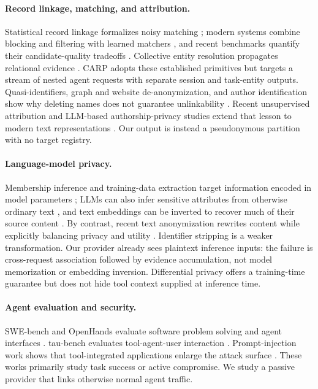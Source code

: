 \documentclass[letterpaper]{article}
\newcommand{\carp}{\textsc{CARP}\xspace}
\begin{document}
\paragraph{Record linkage, matching, and attribution.}
Statistical record linkage formalizes noisy matching \cite{fellegi1969theory}; modern systems combine
blocking and filtering with learned matchers
\cite{christen2012survey,papadakis2020blocking,li2020ditto}, and recent benchmarks quantify their
candidate-quality tradeoffs \cite{neuhof2024benchmark}. Collective entity resolution propagates
relational evidence \cite{bhattacharya2007collective}. \carp adopts these established primitives but
targets a stream of nested agent requests with separate session and task-entity outputs.
Quasi-identifiers, graph and website de-anonymization, and author identification show why deleting
names does not guarantee unlinkability
\cite{sweeney2002kanonymity,narayanan2009anonymizing,panchenko2016website,narayanan2012author}.
Recent unsupervised attribution and LLM-based authorship-privacy studies extend that lesson to modern
text representations \cite{bertocco2023unsupervised,nguyen2025authorship}. Our output is instead a
pseudonymous partition with no target registry.

\paragraph{Language-model privacy.}
Membership inference and training-data extraction target information encoded in model parameters
\cite{shokri2017membership,carlini2021extracting}; LLMs can also infer sensitive attributes from
otherwise ordinary text \cite{staab2024beyond}, and text embeddings can be inverted to recover much
of their source content \cite{morris2023embeddings}. By contrast, recent text anonymization rewrites
content while explicitly balancing privacy and utility \cite{yang2025anonymization}. Identifier
stripping is a weaker transformation. Our provider already sees plaintext inference inputs: the
failure is cross-request association followed by evidence accumulation, not model memorization or
embedding inversion. Differential privacy offers a training-time guarantee
\cite{dwork2006calibrating} but does not hide tool context supplied at inference time.

\paragraph{Agent evaluation and security.}
SWE-bench and OpenHands evaluate software problem solving and agent interfaces
\cite{jimenez2023swebench,wang2024openhands}. tau-bench evaluates tool-agent-user interaction
\cite{yao2024taubench}. Prompt-injection work shows that tool-integrated applications enlarge the
attack surface \cite{greshake2023indirect,debenedetti2024agentdojo,yi2025promptinjection}. These works
primarily study
task success or active compromise. We study a passive provider that links otherwise normal agent
traffic.
\end{document}
